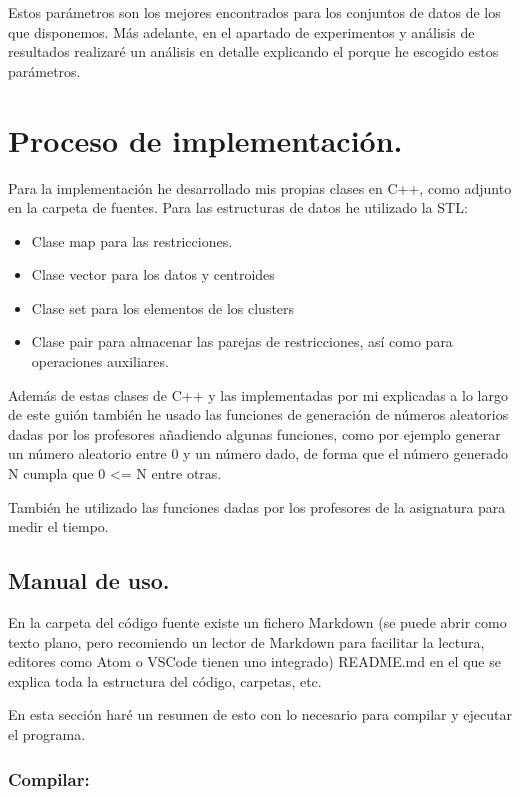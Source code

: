 \documentclass[12pt, spanish]{article}
\begin{document}
Estos parámetros son los mejores encontrados para los conjuntos de datos de los que disponemos. Más adelante, en el apartado de experimentos y análisis de resultados realizaré un análisis en detalle explicando el porque he escogido estos parámetros.



\section{Proceso de implementación.}

Para la implementación he desarrollado mis propias clases en C++, como adjunto en la carpeta de fuentes. Para las estructuras de datos he utilizado la STL:

\begin{itemize}
	\item Clase map para las restricciones.
	\item Clase vector para los datos y centroides
	\item Clase set para los elementos de los clusters
	\item Clase pair para almacenar las parejas de restricciones, así como para operaciones auxiliares.
\end{itemize}

Además de estas clases de C++ y las implementadas por mi explicadas a lo largo de este guión también he usado las funciones de generación de números aleatorios dadas por los profesores añadiendo algunas funciones, como por ejemplo generar un número aleatorio entre 0 y un número dado, de forma que el número generado N cumpla que 0 <= N entre otras.

También he utilizado las funciones dadas por los profesores de la asignatura para medir el tiempo.


\subsection{Manual de uso.}

En la carpeta del código fuente existe un fichero Markdown (se puede abrir como texto plano, pero recomiendo un lector de Markdown para facilitar la lectura, editores como Atom o VSCode tienen uno integrado) README.md en el que se explica toda la estructura del código, carpetas, etc.

En esta sección haré un resumen de esto con lo necesario para compilar y ejecutar el programa.

\subsubsection{Compilar:}
\end{document}
